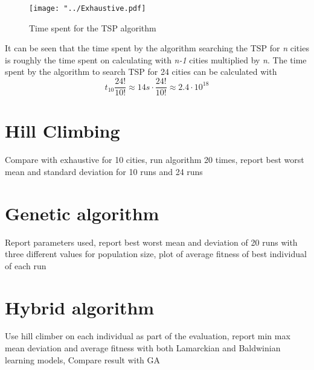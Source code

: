 \documentclass{article}
\begin{document}
\begin{figure}[H]
\begin{center}
\texttt{[image: "../Exhaustive.pdf]}
\caption{Time spent for the TSP algorithm}
\end{center}
\end{figure}

It can be seen that the time spent by the algorithm searching the TSP for \textit{n} cities is roughly the time spent on calculating with \textit{n-1} cities multiplied by \textit{n}. The time spent by the algorithm to search TSP for 24 cities can be calculated with
\[
	t_{10} \frac{24!}{10!} \approx 14s \cdot \frac{24!}{10!} \approx 2.4 \cdot 10^{18}
\]


\section{Hill Climbing}
Compare with exhaustive for 10 cities, run algorithm 20 times, report best worst mean and standard deviation for 10 runs and 24 runs
\section{Genetic algorithm}
Report parameters used, report best worst mean and deviation of 20 runs with three different values for population size, plot of average fitness of best individual of each run
\section{Hybrid algorithm}
Use hill climber on each individual as part of the evaluation, report min max mean deviation and average fitness with both Lamarckian and Baldwinian learning models, Compare result with GA
\end{document}
